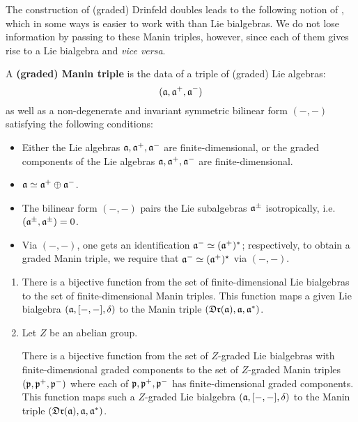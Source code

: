         The construction of (graded) Drinfeld doubles leads to the following notion of , which in some ways is easier to work with than Lie bialgebras. We do not lose information by passing to these Manin triples, however, since each of them gives rise to a Lie bialgebra and \textit{vice versa}.
        \begin{definition} \label{def: manin_triples}
            A \textbf{(graded) Manin triple} is the data of a triple of (graded) Lie algebras:
                $$(\mathfrak{a}, \mathfrak{a}^+, \mathfrak{a}^-)$$
            as well as a non-degenerate and invariant symmetric bilinear form $(-, -)$ satisfying the following conditions:
            \begin{itemize}
                \item Either the Lie algebras $\mathfrak{a}, \mathfrak{a}^+, \mathfrak{a}^-$ are finite-dimensional, or the graded components of the Lie algebras $\mathfrak{a}, \mathfrak{a}^+, \mathfrak{a}^-$ are finite-dimensional.
                \item $\mathfrak{a} \simeq \mathfrak{a}^+ \oplus \mathfrak{a}^-$.
                \item The bilinear form $(-, -)$ pairs the Lie subalgebras $\mathfrak{a}^{\pm}$ isotropically, i.e. $(\mathfrak{a}^{\pm}, \mathfrak{a}^{\pm}) = 0$. 
                \item Via $(-, -)$, one gets an identification $\mathfrak{a}^- \simeq (\mathfrak{a}^+)^*$; respectively, to obtain a graded Manin triple, we require that $\mathfrak{a}^- \simeq (\mathfrak{a}^+)^{\star}$ via $(-, -)$.
            \end{itemize}
        \end{definition}
        \begin{lemma} \label{lemma: lie_bialgebras_from_manin_triples}
            \begin{enumerate}
                \item \cite[Proposition 1.3.4 and Lemma 1.3.5]{chari_pressley_quantum_groups} There is a bijective function from the set of finite-dimensional Lie bialgebras to the set of finite-dimensional Manin triples. This function maps a given Lie bialgebra $(\mathfrak{a}, [-, -], \delta)$ to the Manin triple $(\mathfrak{Dr}(\mathfrak{a}), \mathfrak{a}, \mathfrak{a}^*)$.
                \item Let $Z$ be an abelian group. 

                There is a bijective function from the set of $Z$-graded Lie bialgebras with finite-dimensional graded components to the set of $Z$-graded Manin triples $(\mathfrak{p}, \mathfrak{p}^+, \mathfrak{p}^-)$ where each of $\mathfrak{p}, \mathfrak{p}^+, \mathfrak{p}^-$ has finite-dimensional graded components. This function maps such a $Z$-graded Lie bialgebra $(\mathfrak{a}, [-, -], \delta)$ to the Manin triple $(\mathfrak{Dr}(\mathfrak{a}), \mathfrak{a}, \mathfrak{a}^*)$.
            \end{enumerate}
        \end{lemma}
